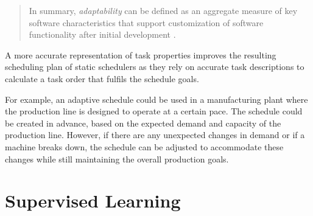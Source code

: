                 

                \begin{quote}
                    In summary, \emph{adaptability} can be defined as an aggregate measure of key software characteristics that support customization of software functionality after initial development \cite{doerrAdaptiveSchedulingRealtime1999}.
                \end{quote}
                A more accurate representation of task properties improves the resulting scheduling plan of static schedulers as they rely on accurate task descriptions to calculate a task order that fulfils the schedule goals.
                
                For example, an adaptive schedule could be used in a manufacturing plant where the production line is designed to operate at a certain pace. The schedule could be created in advance, based on the expected demand and capacity of the production line.
                However, if there are any unexpected changes in demand or if a machine breaks down, the schedule can be adjusted to accommodate these changes while still maintaining the overall production goals.
                








    \section{Supervised Learning}
    \label{sec:supervised-learning}

